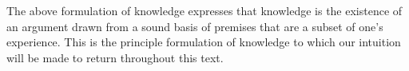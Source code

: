 \documentclass[11pt,titlepage]{report}
\numberwithin{equation}{subsection}
\renewcommand\subsection{\section}
\begin{document}
The above formulation of knowledge expresses that knowledge is the
existence of an argument drawn from a sound basis of premises that are
a subset of one's experience.  This is the principle formulation of
knowledge to which our intuition will be made to return throughout
this text.



\end{document}
